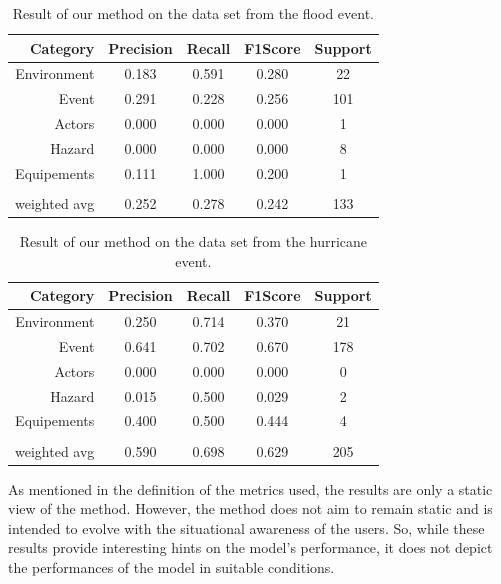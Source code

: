 \begin{table}[bp]
    \centering
    \caption{Result of our method on the data set from the flood event.}
    \begin{tabular}{rcccc}
        Category     & Precision & Recall & F1\-Score & Support \\
        \toprule
        Environment  & 0.183     & 0.591  & 0.280     & 22      \\
        Event        & 0.291     & 0.228  & 0.256     & 101     \\
        Actors       & 0.000     & 0.000  & 0.000     & 1       \\
        Hazard       & 0.000     & 0.000  & 0.000     & 8       \\
        Equipements  & 0.111     & 1.000  & 0.200     & 1       \\
                     &           &        &           &         \\
        weighted avg & 0.252     & 0.278  & 0.242     & 133     \\
        \bottomrule
    \end{tabular}
    \label{table:flood-results}
\end{table}

\begin{table}[bp]
    \centering
    \caption{Result of our method on the data set from the hurricane event.}
    \begin{tabular}{rcccc}
        Category     & Precision & Recall & F1\-Score & Support \\
        \toprule
        Environment  & 0.250     & 0.714  & 0.370     & 21      \\
        Event        & 0.641     & 0.702  & 0.670     & 178     \\
        Actors       & 0.000     & 0.000  & 0.000     & 0       \\
        Hazard       & 0.015     & 0.500  & 0.029     & 2       \\
        Equipements  & 0.400     & 0.500  & 0.444     & 4       \\
                     &           &        &           &         \\
        weighted avg & 0.590     & 0.698  & 0.629     & 205     \\
        \bottomrule
    \end{tabular}
    \label{table:hurricane-results}
\end{table}

As mentioned in the definition of the metrics used, the results are only a static view of the method.
However, the method does not aim to remain static and is intended to evolve with the situational awareness of the users.
So, while these results provide interesting hints on the model's performance, it does not depict the performances of the model in suitable conditions.

